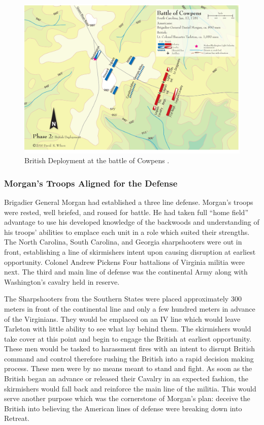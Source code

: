 \begin{figure}[h]
    \begin{center}
    \includegraphics[width=6in]{gfx/beiber02}
    \end{center}
    \caption{British Deployment at the battle of Cowpens \cite{wilson_blogmap}.}
    \label{terrain1}
\end{figure}


\subsubsection{Morgan's Troops Aligned for the Defense}

Brigadier General Morgan had established a three line defense. Morgan's troops
were rested, well briefed, and roused for battle. He had taken full ``home
field'' advantage to use his developed knowledge of the backwoods and
understanding of his troops' abilities to emplace each unit in a role which
suited their strengths. The North Carolina, South Carolina, and Georgia
sharpshooters were out in front, establishing a line of skirmishers intent upon
causing disruption at earliest opportunity. Colonel Andrew Pickens Four
battalions of Virginia militia were next. The third and main line of defense
was the continental Army along with Washington's cavalry held in reserve.

The Sharpshooters from the Southern States were placed approximately 300 meters
in front of the continental line \cite[48]{moncure_cowpens_1996} and only a few
hundred meters in advance of the Virginians. They would be emplaced on an IV
line which would leave Tarleton with little ability to see what lay behind
them. The skirmishers would take cover at this point and begin to engage the
British at earliest opportunity. These men would be tasked to harassment fires
with an intent to disrupt British command and control therefore rushing the
British into a rapid decision making process. These men were by no means meant
to stand and fight.  As soon as the British began an advance or released their
Cavalry in an expected fashion, the skirmishers would fall back and reinforce
the main line of the militia. This would serve another purpose which was the
cornerstone of Morgan's plan: deceive the British into believing the American
lines of defense were breaking down into Retreat.

